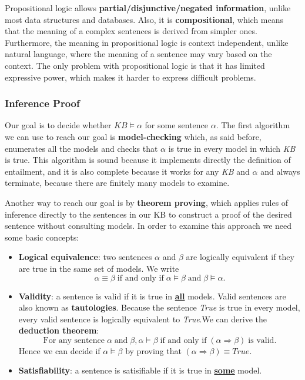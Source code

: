 \documentclass{article}
\begin{document}
Propositional logic allows \textbf{partial/disjunctive/negated information}, unlike most data structures and databases. Also, it is \textbf{compositional}, which means that the meaning of a complex sentences is derived from simpler ones. Furthermore, the meaning in propositional logic is context independent, unlike natural language, where the meaning of a sentence may vary based on the context. The only problem with propositional logic is that it has limited expressive power, which makes it harder to express difficult problems.

\subsubsection{Inference Proof}
Our goal is to decide whether $KB \models \alpha$ for some sentence $\alpha$. The first algorithm we can use to reach our goal is \textbf{model-checking} which, as said before, enumerates all the models and checks that $\alpha$ is true in every model in which \textit{KB} is true. This algorithm is sound because it implements directly the definition of entailment, and it is also complete because it works for any \textit{KB} and $\alpha$ and always terminate, because there are finitely many models to examine.

Another way to reach our goal is by \textbf{theorem proving}, which applies rules of inference directly to the sentences in our KB to construct a proof of the desired sentence without consulting models. In order to examine this approach we need some basic concepts:
\begin{itemize}
    \item \textbf{Logical equivalence}: two sentences $\alpha$ and $\beta$ are logically equivalent if they are true in the same set of models. We write 
        \[\alpha\equiv\beta \;\text{if and only if}\; \alpha\models\beta \;\text{and}\; \beta\models\alpha.\]
    
    \item \textbf{Validity}: a sentence is valid if it is true in \underline{\textbf{all}} models. Valid sentences are also known as \textbf{tautologies}. Because the sentence \textit{True} is true in every model, every valid sentence is logically equivalent to \textit{True}.We can derive the \textbf{deduction theorem}:
    \[\text{For any sentence}\; \alpha \;\text{and}\; \beta, \alpha\models\beta \;\text{if and only if}\; (\alpha\Rightarrow\beta) \;\text{is valid}.\]
    Hence we can decide if $\alpha\models\beta$ by proving that $(\alpha\Rightarrow\beta)\equiv True$.
    
    \item \textbf{Satisfiability}: a sentence is satisifiable if it is true in \underline{\textbf{some}} model.
\end{itemize}
\end{document}
